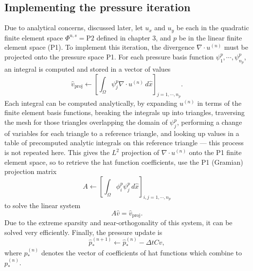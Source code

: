 \subsection{Implementing the pressure iteration}
Due to analytical concerns, discussed later, let $u_x$ and $u_y$ be each in the quadratic finite element space $\Phi^{u,s} = \text{P2}$ defined in chapter 3,
and $p$ be in the linear finite element space (P1).
To implement this iteration, the divergence $\nabla\cdot u^{(n)}$ must be projected onto the pressure space P1.
For each pressure basis function $\psi^p_1,\cdots,\psi^p_{n_p}$, an integral is computed and stored in a vector of values
$$
    \hat{v}_{\text{proj}} \leftarrow \left[\int_\Omega \psi^p_j \nabla\cdot u^{(n)}\,d\hat{x}\right]_{j=1,\cdots,n_p}.
$$
Each integral can be computed analytically, by expanding $u^{(n)}$ in terms of the finite element basis functions,
breaking the integrals up into triangles, traversing the mesh for those triangles overlapping the domain of $\psi^p_j$,
performing a change of variables for each triangle to a reference triangle,
and looking up values in a table of precomputed analytic integrals on this reference triangle --- this process is not repeated here.
This gives the $L^2$ projection of $\nabla\cdot u^{(n)}$ onto the P1 finite element space, so to retrieve the hat function coefficients,
use the P1 (Gramian) projection matrix
$$
    A \leftarrow \left[ \int_\Omega \phi^p_i\psi^p_j \,d\hat{x}\right]_{i,j=1,\cdots,n_p}
$$
to solve the linear system
$$
    A\hat{v} = \hat{v}_{\text{proj}}.
$$
Due to the extreme sparsity and near-orthogonality of this system, it can be solved very efficiently. Finally,
the pressure update is
$$
    \hat{p}_*^{(n+1)} \leftarrow \hat{p}_*^{(n)} - \Delta t C \hat{v},
$$
where $\hat{p}_*^{(n)}$ denotes the vector of coefficients of hat functions which combine to $p_*^{(n)}$.

